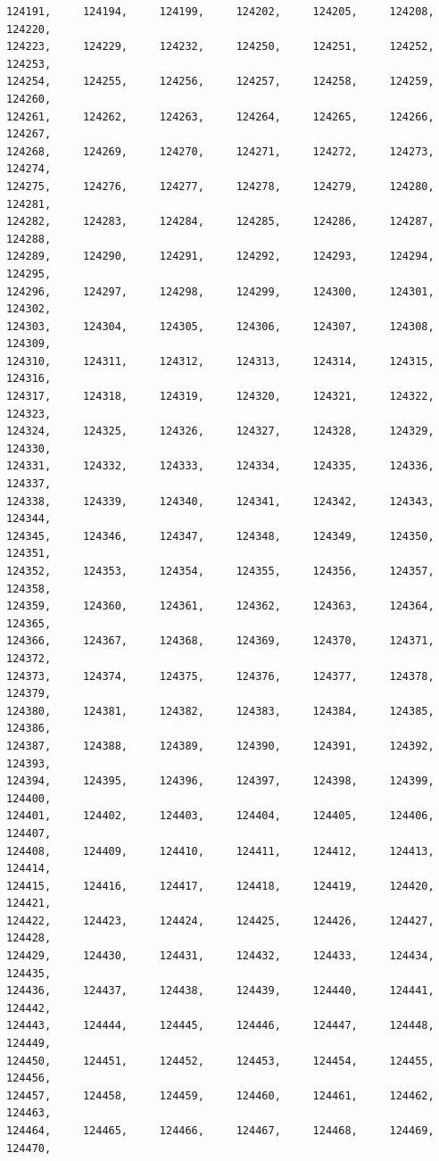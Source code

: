 \documentclass[a4paper,11pt]{report}
\begin{document}
\begin{verbatim}
124191,     124194,     124199,     124202,     124205,     124208,     124220,
124223,     124229,     124232,     124250,     124251,     124252,     124253,
124254,     124255,     124256,     124257,     124258,     124259,     124260,
124261,     124262,     124263,     124264,     124265,     124266,     124267,
124268,     124269,     124270,     124271,     124272,     124273,     124274,
124275,     124276,     124277,     124278,     124279,     124280,     124281,
124282,     124283,     124284,     124285,     124286,     124287,     124288,
124289,     124290,     124291,     124292,     124293,     124294,     124295,
124296,     124297,     124298,     124299,     124300,     124301,     124302,
124303,     124304,     124305,     124306,     124307,     124308,     124309,
124310,     124311,     124312,     124313,     124314,     124315,     124316,
124317,     124318,     124319,     124320,     124321,     124322,     124323,
124324,     124325,     124326,     124327,     124328,     124329,     124330,
124331,     124332,     124333,     124334,     124335,     124336,     124337,
124338,     124339,     124340,     124341,     124342,     124343,     124344,
124345,     124346,     124347,     124348,     124349,     124350,     124351,
124352,     124353,     124354,     124355,     124356,     124357,     124358,
124359,     124360,     124361,     124362,     124363,     124364,     124365,
124366,     124367,     124368,     124369,     124370,     124371,     124372,
124373,     124374,     124375,     124376,     124377,     124378,     124379,
124380,     124381,     124382,     124383,     124384,     124385,     124386,
124387,     124388,     124389,     124390,     124391,     124392,     124393,
124394,     124395,     124396,     124397,     124398,     124399,     124400,
124401,     124402,     124403,     124404,     124405,     124406,     124407,
124408,     124409,     124410,     124411,     124412,     124413,     124414,
124415,     124416,     124417,     124418,     124419,     124420,     124421,
124422,     124423,     124424,     124425,     124426,     124427,     124428,
124429,     124430,     124431,     124432,     124433,     124434,     124435,
124436,     124437,     124438,     124439,     124440,     124441,     124442,
124443,     124444,     124445,     124446,     124447,     124448,     124449,
124450,     124451,     124452,     124453,     124454,     124455,     124456,
124457,     124458,     124459,     124460,     124461,     124462,     124463,
124464,     124465,     124466,     124467,     124468,     124469,     124470,

\end{verbatim}
\end{document}
